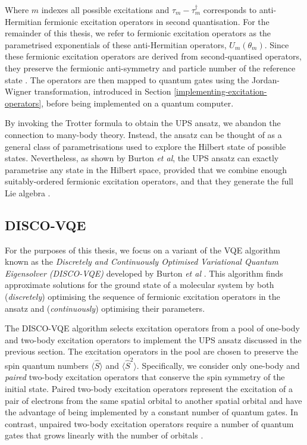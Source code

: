 Where $m$ indexes all possible excitations and $\tau_m - \tau_m^\dagger$ corresponds to anti-Hermitian fermionic excitation operators in second quantisation. For the remainder of this thesis, we refer to fermionic excitation operators as the parametrised exponentials of these anti-Hermitian operators, $U_m(\theta_m)$. Since these fermionic excitation operators are derived from second-quantised operators, they preserve the fermionic anti-symmetry and particle number of the reference state \cite{Burton2023}. The operators are then mapped to quantum gates using the Jordan-Wigner transformation, introduced in Section \ref{implementing-excitation-operators}, before being implemented on a quantum computer.

By invoking the Trotter formula to obtain the UPS ansatz, we abandon the connection to many-body theory. Instead, the ansatz can be thought of as a general class of parametrisations used to explore the Hilbert state of possible states. Nevertheless, as shown by Burton \textit{et al}, the UPS ansatz can exactly parametrise any state in the Hilbert space, provided that we combine enough suitably-ordered fermionic excitation operators, and that they generate the full Lie algebra \cite{Burton2023}.


\subsection{DISCO-VQE}%
\label{disco-vqe}

For the purposes of this thesis, we focus on a variant of the VQE algorithm known as the \textit{Discretely and Continuously Optimised Variational Quantum Eigensolver (DISCO-VQE)} developed by Burton \textit{et al} \cite{Burton2023}. This algorithm finds approximate solutions for the ground state of a molecular system by both (\textit{discretely}) optimising the sequence of fermionic excitation operators in the ansatz and (\textit{continuously}) optimising their parameters.

The DISCO-VQE algorithm selects excitation operators from a pool of one-body and two-body excitation operators to implement the UPS ansatz discussed in the previous section. The excitation operators in the pool are chosen to preserve the spin quantum numbers $\langle \hat S \rangle$ and $\langle \hat S^2 \rangle$. Specifically, we consider only one-body and \textit{paired} two-body excitation operators that conserve the spin symmetry of the initial state. Paired two-body excitation operators represent the excitation of a pair of electrons from the same spatial orbital to another spatial orbital and have the advantage of being implemented by a constant number of quantum gates. In contrast, unpaired two-body excitation operators require a number of quantum gates that grows linearly with the number of orbitals \cite{Burton2023}.

